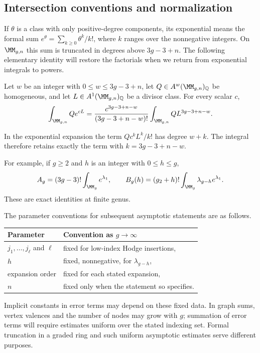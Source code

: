 \subsection{Intersection conventions and normalization}
\label{subsec:s02:01}

If $\theta$ is a class with only positive-degree components, its
exponential means the formal sum
$e^\theta=\sum_{k\geq0}\theta^k/k!$, where $k$ ranges over the
nonnegative integers.  On $\MM_{g,n}$ this sum is truncated in degrees
above $3g-3+n$.  The following elementary identity will restore the
factorials when we return from exponential integrals to powers.

\begin{lmm}
\label{lmm:s02:exp-to-power}
Let $w$ be an integer with $0\leq w\leq3g-3+n$, let
$Q\in A^w(\MM_{g,n})_{\mathbb Q}$ be homogeneous, and let
$L\in A^1(\MM_{g,n})_{\mathbb Q}$ be a divisor class.  For every scalar
$c$,
\begin{equation}
\label{eq:s02:exp-to-power}
\int_{\MM_{g,n}}Qe^{cL}
=\frac{c^{3g-3+n-w}}{(3g-3+n-w)!}
  \int_{\MM_{g,n}}QL^{3g-3+n-w}.
\end{equation}
\end{lmm}

\begin{prf}
In the exponential expansion the term $Qc^kL^k/k!$ has degree $w+k$.
The integral therefore retains exactly the term with
$k=3g-3+n-w$.
\end{prf}

For example, if $g\geq2$ and $h$ is an integer with $0\leq h\leq g$,
\begin{equation}
\label{eq:s02:hodge-factorials}
A_g=(3g-3)!\int_{\MM_g}e^{\lambda_1},
\qquad
B_g(h)=(g_2+h)!\int_{\MM_g}\lambda_{g-h}e^{\lambda_1}.
\end{equation}
These are exact identities at finite genus.

The parameter conventions for subsequent asymptotic statements are as
follows.
\begin{center}
\begin{tabular}{ll}
Parameter & Convention as $g\to\infty$ \\
\hline
$j_1,\ldots,j_\ell$ and $\ell$ & fixed for low-index Hodge insertions, \\
$h$ & fixed, nonnegative, for $\lambda_{g-h}$, \\
expansion order & fixed for each stated expansion, \\
$n$ & fixed only when the statement so specifies.
\end{tabular}
\end{center}
Implicit constants in error terms may depend on these fixed data.
In graph sums, vertex valences and the number of nodes may grow with
$g$; summation of error terms will require estimates uniform over the
stated indexing set.  Formal truncation in a graded ring and such
uniform asymptotic estimates serve different purposes.
